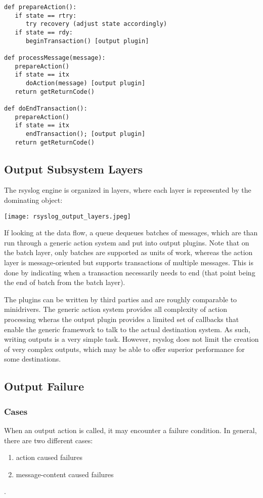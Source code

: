 \documentclass[a4paper,10pt]{article}
\begin{document}
\lstset{language=python}
\begin{lstlisting}
def prepareAction():
   if state == rtry:
      try recovery (adjust state accordingly)
   if state == rdy:
      beginTransaction() [output plugin]
    
def processMessage(message):
   prepareAction()
   if state == itx
      doAction(message) [output plugin]
   return getReturnCode()

def doEndTransaction():
   prepareAction()
   if state == itx
      endTransaction(); [output plugin]
   return getReturnCode()
\end{lstlisting}

\subsection{Output Subsystem Layers}
The rsyslog engine is organized in layers, where each layer is represented by the dominating object:

\begin{center}
\texttt{[image: rsyslog\_output\_layers.jpeg]}
\end{center}

If looking at the data flow, a queue dequeues batches of messages, which are than run through a generic action system and put into output plugins. Note that on the batch layer, only batches are supported as units of work, whereas the action layer is message-oriented but supports transactions of multiple messages. This is done by indicating when a transaction necessarily needs to end (that point being the end of batch from the batch layer).

The plugins can be written by third parties and are roughly comparable to minidrivers. The generic action system provides all complexity of action processing wheras the output plugin provides a limited set of callbacks that enable the generic framework to talk to the actual destination system. As such, writing outputs is a very simple task. However, rsyslog does not limit the creation of very complex outputs, which may be able to offer superior performance for some destinations.

\subsection{Output Failure}
\subsubsection{Cases}
When an output action is called, it may encounter a failure condition. In general, there are two different cases:
\begin{enumerate}
\item action caused failures
\item message-content caused failures
\end{enumerate}.
\end{document}
